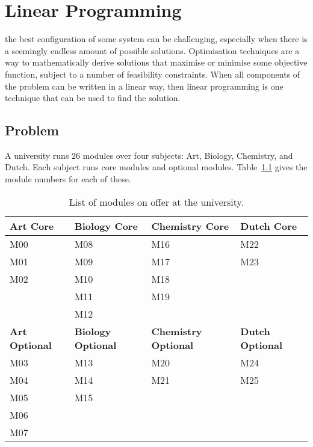 \chapter[Linear programming]{Linear Programming}

 the best configuration of some system can be
challenging, especially when there is a seemingly endless amount of possible
solutions. Optimisation techniques are a way to mathematically derive solutions
that maximise or minimise some objective function, subject to a number of
feasibility constraints. When all components of the problem can be written in a
linear way, then linear programming is one technique that can be used to find
the solution.

\section{Problem}\label{sec:problem}
A university runs 26 modules over four subjects: Art, Biology, Chemistry, and
Dutch. Each subject runs core modules and optional modules.
Table~\ref{tab:modules} gives the module numbers for each of these.

\begin{table}
\begin{center}
\begin{tabular}{llll}
\toprule
\textbf{Art Core} & \textbf{Biology Core} & \textbf{Chemistry Core} & \textbf{Dutch Core}\\
\midrule
M00 & M08 & M16 & M22 \\
M01 & M09 & M17 & M23 \\
M02 & M10 & M18 &     \\
    & M11 & M19 &     \\
    & M12 &     &     \\
\midrule
\textbf{Art Optional} & \textbf{Biology Optional} & \textbf{Chemistry Optional} & \textbf{Dutch Optional}\\
\midrule
M03 & M13 & M20 & M24 \\
M04 & M14 & M21 & M25 \\
M05 & M15 &     &     \\
M06 &     &     &     \\
M07 &     &     &     \\
\bottomrule
\end{tabular}
\end{center}
\caption{List of modules on offer at the university.}
\label{tab:modules}
\end{table}

